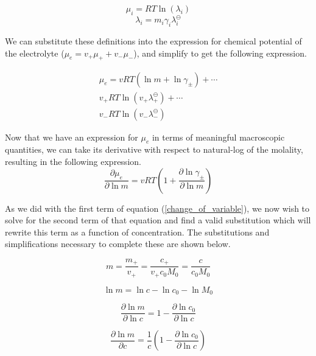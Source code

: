 \documentclass[lettersize,journal]{IEEEtran}
\begin{document}
\begin{equation}
\mu_{i}=R T \ln \left(\lambda_{i}\right)
\end{equation}
\begin{equation}
\lambda_{i}=m_{i} \gamma_{i} \lambda_{i}^{\ominus}
\end{equation}


We can substitute these definitions into the expression for chemical potential of the electrolyte ($\mu_{e}=v_{+} \mu_{+}+v_{-} \mu_{-} $), and simplify to get the following expression.

\begin{equation}
\begin{aligned}
\mu_{e}= v R T\left(\ln m+\ln \gamma_{\pm}\right)+ \cdots \\
v_{+} R T \ln \left(v_{+} \lambda_{+}^{\ominus}\right)+ \cdots \\
v_{-} R T \ln \left(v_{-} \lambda_{-}^{\ominus}\right)
\end{aligned}
\end{equation}


Now that we have an expression for $\mu_e$ in terms of meaningful macroscopic quantities, we can take its derivative with respect to natural-log of the molality, resulting in the following expression.
\begin{equation}\label{chemical_pot_substitute}
\frac{\partial \mu_{e}}{\partial \ln m}=v R T\left(1+\frac{\partial \ln \gamma_{\pm}}{\partial \ln m}\right)
\end{equation}


As we did with the first term of equation (\ref{change_of_variable}), we now wish to solve for the second term of that equation and find a valid substitution which will rewrite this term as a function of concentration. The substitutions and simplifications necessary to complete these are shown below.

\begin{equation}
m=\frac{m_{+}}{v_{+}}=\frac{c_{+}}{v_{+} c_{0} M_{0}}=\frac{c}{c_{0} M_{0}}
\end{equation}


\begin{equation}
\ln m=\ln c-\ln c_{0}-\ln M_{0}
\end{equation}

\begin{equation}
\frac{\partial \ln m}{\partial \ln c}=1-\frac{\partial \ln c_{0}}{\partial \ln c}
\end{equation}

\begin{equation}\label{concentation_subsitute}
\frac{\partial \ln m}{\partial c}=\frac{1}{c}\left(1-\frac{\partial \ln c_{0}}{\partial \ln c}\right)
\end{equation}
\end{document}
